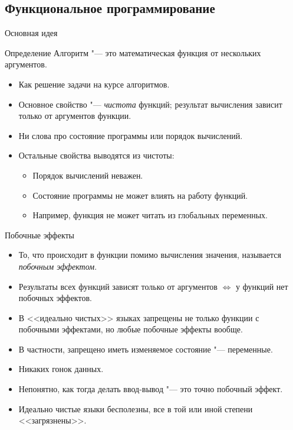 \subsection{Функциональное программирование}
\begin{frame}
\end{frame}

\begin{frame}{Основная идея}
	\begin{exampleblock}{Определение}
		Алгоритм "--- это математическая функция от нескольких аргументов.
	\end{exampleblock}
	\begin{itemize}
		\item Как решение задачи на курсе алгоритмов.
		\item Основное свойство "--- \textit{чистота} функций; результат вычисления зависит только от аргументов функции.
		\item Ни слова про состояние программы или порядок вычислений.
		\item Остальные свойства выводятся из чистоты:
			\begin{itemize}
				\item Порядок вычислений неважен.
				\item Состояние программы не может влиять на работу функций.
				\item Например, функция не может читать из глобальных переменных.
			\end{itemize}
	\end{itemize}
\end{frame}

\begin{frame}{Побочные эффекты}
	\begin{itemize}
		\item То, что происходит в функции помимо вычисления значения, называется \textit{побочным эффектом}.
		\item Результаты всех функций зависят только от аргументов $\iff$ у функций нет побочных эффектов.
		\item В <<идеально чистых>> языках запрещены не только функции с побочными эффектами, но любые побочные эффекты вообще.
		\item В частности, запрещено иметь изменяемое состояние "--- переменные.
		\item Никаких гонок данных.
		\item Непонятно, как тогда делать ввод-вывод "--- это точно побочный эффект.
		\item Идеально чистые языки бесполезны, все в той или иной степени <<загрязнены>>.
	\end{itemize}
\end{frame}
